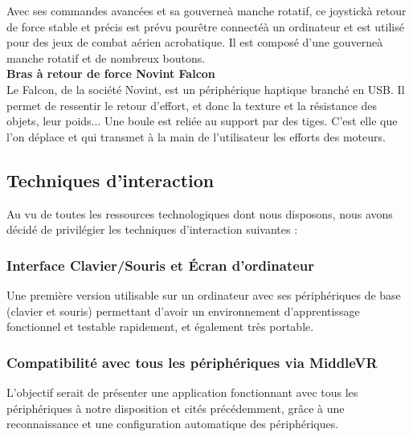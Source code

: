 Avec ses commandes avanc\'ees et sa gouverne\`a manche rotatif, ce joystick\`a retour de force stable et pr\'ecis est pr\'evu pour\^etre connect\'e\`a un ordinateur et est utilis\'e pour des jeux de combat a\'erien acrobatique. Il est compos\'e d'une gouverne\`a manche rotatif et de nombreux boutons.
\\

\textbf{Bras \`a retour de force Novint Falcon}
\\

Le Falcon, de la soci\'et\'e Novint, est un p\'eriph\'erique haptique branch\'e en USB. Il permet de ressentir le retour d'effort, et donc la texture et la r\'esistance des objets, leur poids... Une boule est reli\'ee au support par des tiges. C'est elle que l'on d\'eplace et qui transmet \`a la main de l'utilisateur les efforts des moteurs.
\\

\subsection{Techniques d'interaction}
Au vu de toutes les ressources technologiques dont nous disposons, nous avons d\'ecid\'e de privilégier les techniques d'interaction suivantes :

\subsubsection{Interface Clavier/Souris et \'Ecran d'ordinateur}
Une premi\`ere version utilisable sur un ordinateur avec ses p\'eriph\'eriques de base (clavier et souris) permettant d'avoir un environnement d'apprentissage fonctionnel et testable rapidement, et \'egalement tr\`es portable.

\subsubsection{Compatibilit\'e avec tous les p\'eriph\'eriques via MiddleVR}
L'objectif serait de présenter une application fonctionnant avec tous les p\'eriph\'eriques \`a notre disposition et cit\'es pr\'ec\'edemment, gr\^ace \`a une reconnaissance et une configuration automatique des p\'eriph\'eriques.
\\
